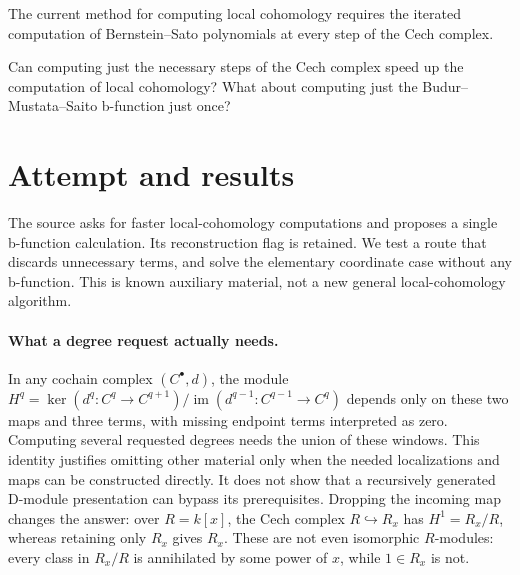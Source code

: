 \documentclass[11pt]{article}
\begin{document}
The current method for computing local cohomology requires the iterated computation of Bernstein--Sato polynomials at every step of the Cech complex.

Can computing just the necessary steps of the Cech complex speed up the computation of local cohomology? What about computing just the Budur--Mustata--Saito b-function just once?

\section{Attempt and results}
The source asks for faster local-cohomology computations and proposes a single
b-function calculation. Its reconstruction flag is retained. We test a route
that discards unnecessary terms, and solve the elementary coordinate case
without any b-function. This is known auxiliary material, not a new general
local-cohomology algorithm.

\paragraph{What a degree request actually needs.}
In any cochain complex $(C^\bullet,d)$, the module
$H^q=\ker(d^q:C^q\to C^{q+1})/\operatorname{im}(d^{q-1}:C^{q-1}\to C^q)$
depends only on these two maps and three terms, with missing endpoint terms
interpreted as zero. Computing several requested degrees needs the union of
these windows. This identity justifies omitting other material only when the
needed localizations and maps can be constructed directly. It does not show
that a recursively generated D-module presentation can bypass its prerequisites.
Dropping the incoming map changes the answer: over $R=k[x]$, the Cech complex
$R\hookrightarrow R_x$ has $H^1=R_x/R$, whereas retaining only $R_x$ gives
$R_x$. These are not even isomorphic $R$-modules: every class in $R_x/R$ is
annihilated by some power of $x$, while $1\in R_x$ is not.
\end{document}
